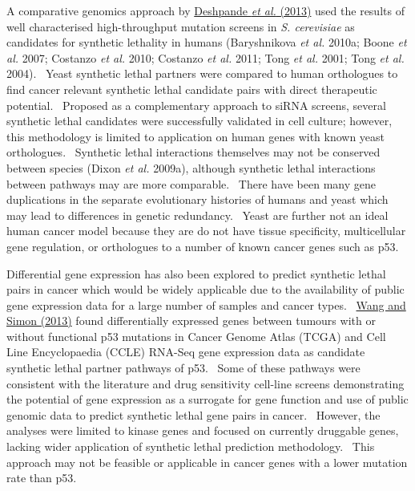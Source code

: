 A comparative genomics approach by
\hyperlink{ENREF30}{Deshpande}\hyperlink{ENREF30}{\textit{ et
al.}}\hyperlink{ENREF30}{ (2013)} used the results of well
characterised high-throughput mutation screens in \textit{S. cerevisiae
}as candidates for synthetic lethality in humans (Baryshnikova\textit{
et al.} 2010a; Boone\textit{ et al.} 2007; Costanzo\textit{ et al.}
2010; Costanzo\textit{ et al.} 2011; Tong\textit{ et al.} 2001;
Tong\textit{ et al.} 2004). \ Yeast synthetic lethal partners were
compared to human orthologues to find cancer relevant synthetic lethal
candidate pairs with direct therapeutic potential. \ Proposed as a
complementary approach to siRNA screens, several synthetic lethal
candidates were successfully validated in cell culture; however, this
methodology is limited to application on human genes with known yeast
orthologues. \ Synthetic lethal interactions themselves may not be
conserved between species (Dixon\textit{ et al.} 2009a), although
synthetic lethal interactions between pathways may are more comparable.
\ There have been many gene duplications in the separate evolutionary
histories of humans and yeast which may lead to differences in genetic
redundancy. \ Yeast are further not an ideal human cancer model because
they are do not have tissue specificity, multicellular gene regulation,
or orthologues to a number of known cancer genes such as p53. \ 


Differential gene expression has also been explored to predict synthetic
lethal pairs in cancer which would be widely applicable due to the
availability of public gene expression data for a large number of
samples and cancer types. \ \hyperlink{ENREF109}{Wang and Simon (2013)}
found differentially expressed genes between tumours with or without
functional p53 mutations in Cancer Genome Atlas (TCGA) and Cell Line
Encyclopaedia (CCLE) RNA-Seq gene expression data as candidate
synthetic lethal partner pathways of p53. \ Some of these pathways were
consistent with the literature and drug sensitivity cell-line screens
demonstrating the potential of gene expression as a surrogate for gene
function and use of public genomic data to predict synthetic lethal
gene pairs in cancer. \ However, the analyses were limited to kinase
genes and focused on currently druggable genes, lacking wider
application of synthetic lethal prediction methodology. \ This approach
may not be feasible or applicable in cancer genes with a lower mutation
rate than p53. \ 


